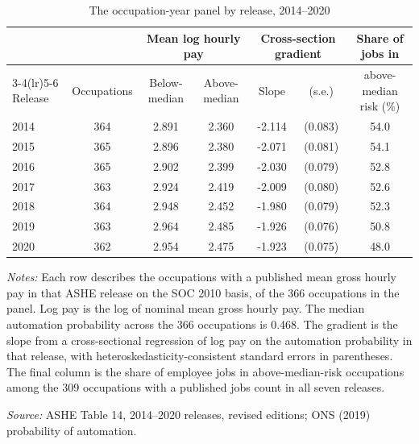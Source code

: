 \begin{table}[!ht]\centering
\caption{The occupation-year panel by release, 2014--2020}\label{tab:sample}
\begin{threeparttable}\footnotesize\setlength{\tabcolsep}{3pt}
\begin{tabular}{lcccccc}\toprule
 & & \multicolumn{2}{c}{Mean log hourly pay} & \multicolumn{2}{c}{Cross-section gradient} & Share of jobs in \\
\cmidrule(lr){3-4}\cmidrule(lr){5-6}
Release & Occupations & Below-median & Above-median & Slope & (s.e.) & above-median risk (\%) \\ \midrule
2014 & 364 & 2.891 & 2.360 & -2.114 & (0.083) & 54.0 \\
2015 & 365 & 2.896 & 2.380 & -2.071 & (0.081) & 54.1 \\
2016 & 365 & 2.902 & 2.399 & -2.030 & (0.079) & 52.8 \\
2017 & 363 & 2.924 & 2.419 & -2.009 & (0.080) & 52.6 \\
2018 & 364 & 2.948 & 2.452 & -1.980 & (0.079) & 52.3 \\
2019 & 363 & 2.964 & 2.485 & -1.926 & (0.076) & 50.8 \\
2020 & 362 & 2.954 & 2.475 & -1.923 & (0.075) & 48.0 \\
\bottomrule\end{tabular}
\begin{tablenotes}\footnotesize
\item \emph{Notes:} Each row describes the occupations with a published mean gross hourly pay in that ASHE release on the SOC 2010 basis, of the 366 occupations in the panel. Log pay is the log of nominal mean gross hourly pay. The median automation probability across the 366 occupations is 0.468. The gradient is the slope from a cross-sectional regression of log pay on the automation probability in that release, with heteroskedasticity-consistent standard errors in parentheses. The final column is the share of employee jobs in above-median-risk occupations among the 309 occupations with a published jobs count in all seven releases.
\item \emph{Source:} ASHE Table 14, 2014--2020 releases, revised editions; ONS (2019) probability of automation.
\end{tablenotes}\end{threeparttable}\end{table}